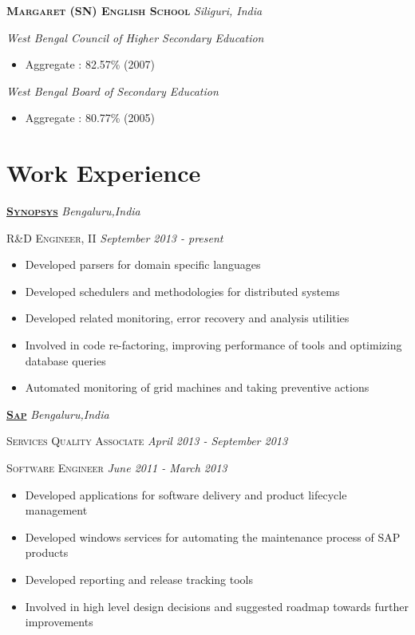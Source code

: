 \documentclass[]{article}
\begin{document}
{{{{{\raggedright\textsc{\textbf{Margaret (SN) English School}} \hfill {\raggedleft\textit{Siliguri, India}}
{\raggedright\textit{West Bengal Council of Higher Secondary Education}}
\begin{itemize}\item Aggregate : 82.57\% (2007)\end{itemize}
{\raggedright\textit{West Bengal Board of Secondary Education}}
\begin{itemize}\item Aggregate : 80.77\% (2005)\end{itemize}

\section{Work Experience}
{\raggedright\textsc{\textbf{\href{http://www.synopsys.com/}{Synopsys}}} \hfill {\raggedleft\textit{Bengaluru,India}}

{\raggedright\textsc{R\&D Engineer, II} \hfill {\raggedleft\textit{September 2013 - present}}

\begin{itemize}
\item Developed parsers for domain specific languages
\item Developed schedulers and methodologies for distributed systems
\item Developed related monitoring, error recovery and analysis utilities
\item Involved in code re-factoring, improving performance of tools and optimizing database queries
\item Automated monitoring of grid machines and taking preventive actions 
\end{itemize}

{\raggedright\textsc{\textbf{\href{http://sap.com/}{Sap}}} \hfill {\raggedleft\textit{Bengaluru,India}}

{\raggedright\textsc{Services Quality Associate} {\textit{April 2013 - September 2013}}

{\raggedright\textsc{Software Engineer} \hfill {\raggedleft\textit{June 2011 - March 2013}}

\begin{itemize}
\item Developed applications for software delivery and product lifecycle management
\item Developed windows services for automating the maintenance process of SAP products
\item Developed reporting and release tracking tools
\item Involved in high level design decisions and suggested roadmap towards further improvements
\end{itemize}

}}}}}}}}}}
\end{document}
